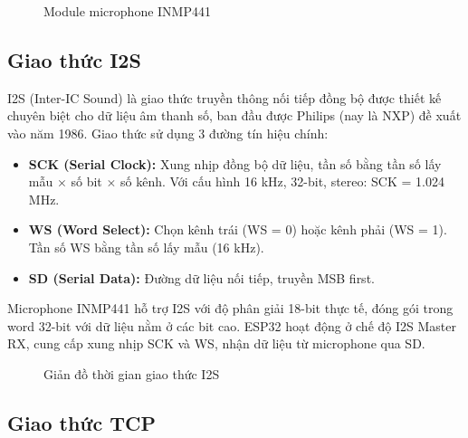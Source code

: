 \begin{figure}[htbp]
\centering
{}
\caption{Module microphone INMP441}
\label{fig:inmp441-module}
\end{figure}

\subsection{Giao thức I2S}

I2S (Inter-IC Sound) là giao thức truyền thông nối tiếp đồng bộ được thiết kế
chuyên biệt cho dữ liệu âm thanh số, ban đầu được Philips (nay là NXP) đề xuất
vào năm 1986. Giao thức sử dụng 3 đường tín hiệu chính:

\begin{itemize}
\item \textbf{SCK (Serial Clock):} Xung nhịp đồng bộ dữ liệu, tần số bằng
  tần số lấy mẫu $\times$ số bit $\times$ số kênh. Với cấu hình 16 kHz,
  32-bit, stereo: SCK = 1.024 MHz.
\item \textbf{WS (Word Select):} Chọn kênh trái (WS = 0) hoặc kênh phải (WS = 1).
  Tần số WS bằng tần số lấy mẫu (16 kHz).
\item \textbf{SD (Serial Data):} Đường dữ liệu nối tiếp, truyền MSB first.
\end{itemize}

Microphone INMP441 hỗ trợ I2S với độ phân giải 18-bit thực tế, đóng gói trong
word 32-bit với dữ liệu nằm ở các bit cao. ESP32 hoạt động ở chế độ I2S Master
RX, cung cấp xung nhịp SCK và WS, nhận dữ liệu từ microphone qua SD.

\begin{figure}[htbp]
\centering
{}
\caption{Giản đồ thời gian giao thức I2S}
\label{fig:i2s-timing}
\end{figure}

\subsection{Giao thức TCP}


